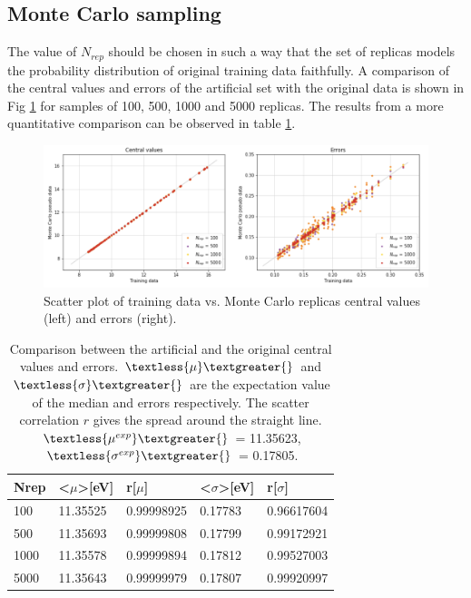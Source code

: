 \documentclass[11pt,a4paper]{article}
\numberwithin{equation}{section}
\numberwithin{figure}{section}
\numberwithin{table}{section}
\begin{document}
\subsection{Monte Carlo sampling}
The value of $N_{rep}$ should be chosen in such a way that the set of replicas models the probability distribution of original training data faithfully. A comparison of the central values and errors of the artificial set with the original data is shown in Fig \ref{mc} for samples of 100, 500, 1000 and 5000 replicas. The results from a more quantitative comparison can be observed in table \ref{tablemc}.

\begin{figure}[H]
    \centering 
    \includegraphics[width=160mm]{plots/MC.png}
    \caption{Scatter plot of training data vs. Monte Carlo replicas central values (left) and errors (right). }
    \label{mc}
\end{figure}

\begin{table}[H]
\centering
\begin{tabular}{|l|ll|ll|}
\hline
Nrep & \textless{}$\mu$\textgreater {[}eV{]} & r{[}$\mu${]} & \textless{}$\sigma$\textgreater {[}eV{]} & r{[}$\sigma${]} \\ \hline
100  & 11.35525                              & 0.99998925   & 0.17783                                  & 0.96617604      \\ \hline
500  & 11.35693                              & 0.99999808   & 0.17799                                  & 0.99172921      \\ \hline
1000 & 11.35578                              & 0.99999894   & 0.17812                                  & 0.99527003      \\ \hline
5000 & 11.35643                              & 0.99999979   & 0.17807                                  & 0.99920997      \\ \hline
\end{tabular}
\caption{Comparison between the artificial and the original central values and errors. $\textless{\mu}\textgreater{}$ and $\textless{\sigma}\textgreater{}$ are the expectation value of the median and errors respectively. The scatter correlation $r$ gives the spread around the straight line. $\textless{\mu^{exp}}\textgreater{}$ = 11.35623, $\textless{\sigma^{exp}}\textgreater{}$ = 0.17805. }
\label{tablemc}
\end{table}
\end{document}
